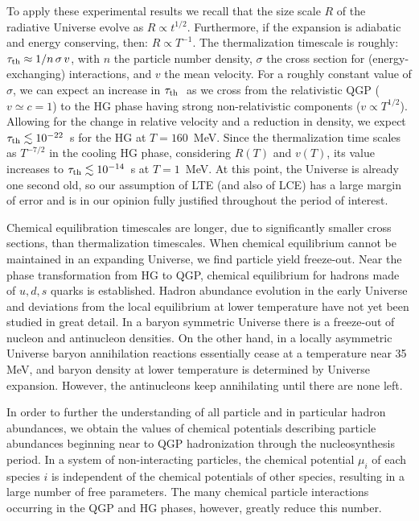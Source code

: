 \begin{mdframed}[linecolor=gray,roundcorner=12pt,backgroundcolor=Dandelion!15,linewidth=1pt,leftmargin=0cm,rightmargin=0cm,topline=true,bottomline=true,skipabove=12pt]
To  apply these experimental results we recall that the size scale $R$  of the radiative Universe  evolve as $R \propto t^{1/2}$. Furthermore, if the expansion is adiabatic and energy conserving, then: $R \propto T^{-1}$. The thermalization timescale is roughly: $\tau_{\rm th}\approx   {1}/{n\, \sigma\, v}$, with $n$ the particle number density, $\sigma$ the cross section for (energy-exchanging) interactions, and $v$ the mean velocity. For a roughly constant value of $\sigma$, we can expect an increase in $\tau_{\rm th}\ $ as we cross from the relativistic QGP ($v \simeq c = 1$) to the HG  phase having strong non-relativistic components ($v \propto T^{1/2}$). Allowing for the change in relative velocity and  a reduction in density, we expect $\tau_{\rm th}\lesssim 10^{-22}$~s for the HG at $T = 160$~MeV. Since the thermalization time scales as $T^{-7/2}$  in the cooling HG phase, considering $R(T)$ and $v(T)$, its value increases to $\tau_{\rm th}\lesssim 10^{-14}$~s at $T=1$~MeV. At this point, the Universe is already one second old, so our assumption of LTE (and also of LCE) has a large margin of error and is in our opinion fully justified throughout the period of interest.

Chemical equilibration timescales are longer, due to  significantly smaller cross sections, than thermalization timescales. When chemical equilibrium cannot be  maintained in an expanding Universe, we find particle yield freeze-out. Near the phase transformation from HG to QGP, chemical equilibrium for hadrons made of $u,d,s$ quarks is established. Hadron abundance evolution in the early Universe and deviations from the local equilibrium at lower temperature have not yet been studied in great detail. In a baryon symmetric Universe there is a freeze-out of nucleon and antinucleon densities. On the other hand, in a locally asymmetric Universe  baryon annihilation reactions essentially cease at a temperature near 35 MeV, and baryon density at lower temperature is  determined by Universe expansion. However, the antinucleons keep annihilating  until there are none left. 

In order to further the  understanding of all particle and in particular hadron abundances, we obtain the values of chemical potentials describing particle abundances beginning near to QGP hadronization through the nucleosynthesis period. In a system of non-interacting particles, the chemical potential $\mu_i$ of each species $i$ is independent of the chemical potentials of other species, resulting in a large number of free parameters. The many chemical particle interactions occurring in the QGP and HG phases, however, greatly reduce this number.


\end{mdframed}
